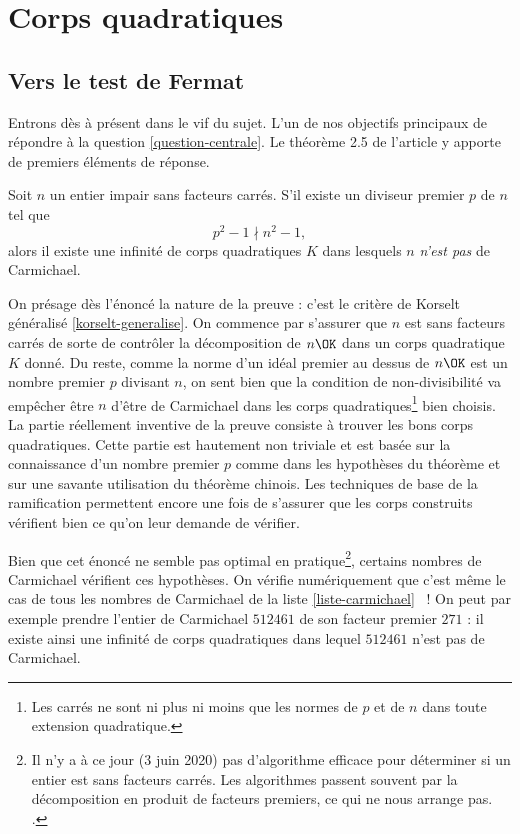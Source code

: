 \section{Corps quadratiques}

\subsection{Vers le test de Fermat}

Entrons dès à présent dans le vif du sujet. L'un de nos objectifs principaux de répondre à la question \ref{question-centrale}. Le théorème 2.5 de l'article y apporte de premiers éléments de réponse.

\begin{theoreme}\label{theoreme-2.5}
	Soit $n$ un entier impair sans facteurs carrés. S'il existe un diviseur premier $p$ de $n$ tel que $$p^2 - 1 \nmid n^2 - 1,$$ alors il existe une infinité de corps quadratiques $K$ dans lesquels $n$ \emph{n'est pas} de Carmichael.
\end{theoreme}

\begin{MotSurPreuve}
	On présage dès l'énoncé la nature de la preuve : c'est le critère de Korselt généralisé \ref{korselt-generalise}. On commence par s'assurer que $n$ est sans facteurs carrés de sorte de contrôler la décomposition de $n\OK$ dans un corps quadratique $K$ donné. Du reste, comme la norme d'un idéal premier au dessus de $n\OK$ est un nombre premier $p$ divisant $n$, on sent bien que la condition de non-divisibilité va empêcher être $n$ d'être de Carmichael dans les corps quadratiques\footnote{Les carrés ne sont ni plus ni moins que les normes de $p$ et de $n$ dans toute extension quadratique.} bien choisis. La partie réellement inventive de la preuve consiste à trouver les bons corps quadratiques. Cette partie est hautement non triviale et est basée sur la connaissance d'un nombre premier $p$ comme dans les hypothèses du théorème et sur une savante utilisation du théorème chinois. Les techniques de base de la ramification permettent encore une fois de s'assurer que les corps construits vérifient bien ce qu'on leur demande de vérifier. \\
\end{MotSurPreuve}

Bien que cet énoncé ne semble pas optimal en pratique\footnote{Il n'y a à ce jour (3 juin 2020) pas d'algorithme efficace pour déterminer si un entier est sans facteurs carrés. Les algorithmes passent souvent par la décomposition en produit de facteurs premiers, ce qui ne nous arrange pas. .}, certains nombres de Carmichael vérifient ces hypothèses. On vérifie numériquement que c'est même le cas de tous les nombres de Carmichael de la liste \ref{liste-carmichael} ~! On peut par exemple prendre l'entier de Carmichael $512461$ de son facteur premier $271$ : il existe ainsi une infinité de corps quadratiques dans lequel $512461$ n'est pas de Carmichael. \\

